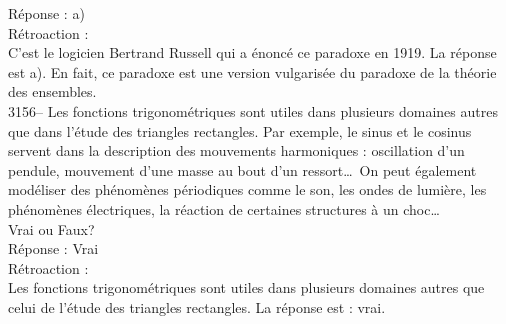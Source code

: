\documentclass[letterpaper, 12pt]{article}
\begin{document}
R\'eponse : a)\\

R\'etroaction :\\
C'est le logicien Bertrand Russell qui a \'enonc\'e ce paradoxe en 1919. La r\'eponse est a). En fait, ce paradoxe est une version vulgaris\'ee du paradoxe de la th\'eorie des ensembles.\\



3156-- Les fonctions trigonom\'etriques sont utiles dans plusieurs domaines autres que dans l'\'etude des triangles rectangles. Par exemple, le sinus et le cosinus servent dans la description des mouvements harmoniques : oscillation d'un pendule, mouvement d'une masse au bout d'un ressort\dots \ On peut \'egalement mod\'eliser des ph\'enom\`enes p\'eriodiques comme le son, les ondes de lumi\`ere, les ph\'enom\`enes \'electriques, la r\'eaction de certaines structures \`a un choc\dots\\
Vrai ou Faux?\\

R\'eponse : Vrai\\

R\'etroaction :\\
Les fonctions trigonom\'etriques sont utiles dans plusieurs domaines autres que celui de l'\'etude des triangles rectangles. La r\'eponse est : vrai.\\
\end{document}
